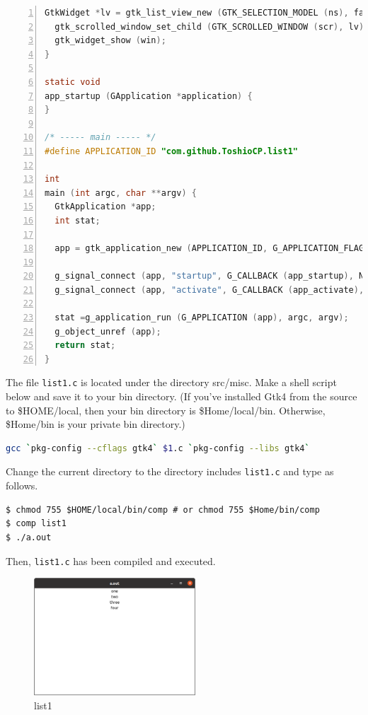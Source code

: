 \begin{lstlisting}[language=C, numbers=left]
  GtkWidget *lv = gtk_list_view_new (GTK_SELECTION_MODEL (ns), factory);
  gtk_scrolled_window_set_child (GTK_SCROLLED_WINDOW (scr), lv);
  gtk_widget_show (win);
}

static void
app_startup (GApplication *application) {
}

/* ----- main ----- */
#define APPLICATION_ID "com.github.ToshioCP.list1"

int
main (int argc, char **argv) {
  GtkApplication *app;
  int stat;

  app = gtk_application_new (APPLICATION_ID, G_APPLICATION_FLAGS_NONE);

  g_signal_connect (app, "startup", G_CALLBACK (app_startup), NULL);
  g_signal_connect (app, "activate", G_CALLBACK (app_activate), NULL);

  stat =g_application_run (G_APPLICATION (app), argc, argv);
  g_object_unref (app);
  return stat;
}
\end{lstlisting}

The file \passthrough{\lstinline!list1.c!} is located under the
directory src/misc. Make a shell script below and save it to your bin
directory. (If you've installed Gtk4 from the source to \$HOME/local,
then your bin directory is \$Home/local/bin. Otherwise, \$Home/bin is
your private bin directory.)

\begin{lstlisting}[language=bash]
gcc `pkg-config --cflags gtk4` $1.c `pkg-config --libs gtk4`
\end{lstlisting}

Change the current directory to the directory includes
\passthrough{\lstinline!list1.c!} and type as follows.

\begin{lstlisting}
$ chmod 755 $HOME/local/bin/comp # or chmod 755 $Home/bin/comp
$ comp list1
$ ./a.out
\end{lstlisting}

Then, \passthrough{\lstinline!list1.c!} has been compiled and executed.

\begin{figure}
\centering
\includegraphics[width=6.04cm,height=4.4cm]{../image/list1.png}
\caption{list1}
\end{figure}

